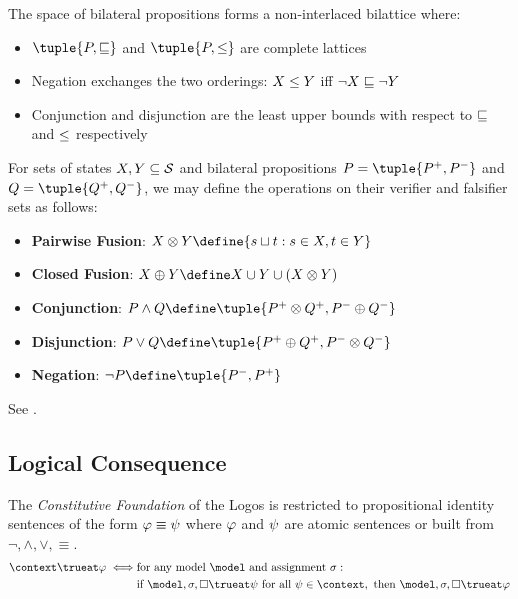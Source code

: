 \documentclass[../LogosReference.tex]{subfiles}
\begin{document}
\begin{remark}
	The space of bilateral propositions forms a non-interlaced bilattice where:
	\begin{itemize}
		\item $\tuple{P, \essence}$ and $\tuple{P, \ground}$ are complete lattices
		\item Negation exchanges the two orderings: $X \leq Y$ iff $\neg X \sqsubseteq \neg Y$
		\item Conjunction and disjunction are the least upper bounds with respect to $\sqsubseteq$ and $\leq$ respectively
	\end{itemize}
\end{remark}

\begin{definition}\label{def:propositional-operations}
	For sets of states $X, Y \subseteq \mathcal{S}$ and bilateral propositions $P = \tuple{P^+, P^-}$ and $Q = \tuple{Q^+, Q^-}$, we may define the operations on their verifier and falsifier sets as follows:
	\begin{itemize}
		\item \textbf{Pairwise Fusion}: $X \otimes Y \define \set{\fusion{s}{t} : s \in X, t \in Y}$
		\item \textbf{Closed Fusion}: $X \oplus Y \define X \cup Y \cup (X \otimes Y)$
		\item \textbf{Conjunction}: $P \land Q \define \tuple{P^+ \otimes Q^+, P^- \oplus Q^-}$
		\item \textbf{Disjunction}: $P \lor Q \define \tuple{P^+ \oplus Q^+, P^- \otimes Q^-}$
		\item \textbf{Negation}: $\neg P \define \tuple{P^-, P^+}$
	\end{itemize}
\end{definition}

\noindent
See .


\subsection{Logical Consequence}\label{sec:logical-consequence-foundation}

\begin{definition}\label{def:consequence-foundation}
	The \textit{Constitutive Foundation} of the Logos is restricted to propositional identity sentences of the form $\varphi \equiv \psi$ where $\varphi$ and $\psi$ are atomic sentences or built from $\neg, \land, \lor, \equiv$.
	\begin{align*}
		\context \trueat \metaA \iff
      & \text{for any model } \model \text{ and assignment } \assignment : \\
      & \text{if } \model, \assignment, \nullstate \trueat \metaB \text{ for all } \metaB \in \context, \text{ then } \model, \assignment, \nullstate \trueat \metaA
	\end{align*}
\end{definition}
\end{document}
